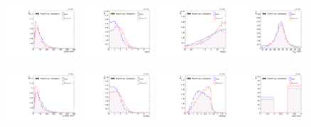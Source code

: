 \begin{figure}[!htb]
    \centering
    \captionsetup{justification=justified}
    \includegraphics[width=0.24\textwidth]{pics/VH_sec/BDT_train_ZH/BDT_dimu_pt.pdf} 
    \includegraphics[width=0.24\textwidth]{pics/VH_sec/BDT_train_ZH/BDT_dimu_abs_eta.pdf}
    \includegraphics[width=0.24\textwidth]{pics/VH_sec/BDT_train_ZH/BDT_dimu_abs_dPhi.pdf}           
    \includegraphics[width=0.24\textwidth]{pics/VH_sec/BDT_train_ZH/BDT_dilep_mass.pdf}

    \includegraphics[width=0.24\textwidth]{pics/VH_sec/BDT_train_ZH/BDT_dilep_pt.pdf}           
    \includegraphics[width=0.24\textwidth]{pics/VH_sec/BDT_train_ZH/BDT_dilep_abs_eta.pdf}
    \includegraphics[width=0.24\textwidth]{pics/VH_sec/BDT_train_ZH/BDT_dilep_dR.pdf}           
    \includegraphics[width=0.24\textwidth]{pics/VH_sec/BDT_train_ZH/BDT_lep_ID.pdf}


\end{figure}
